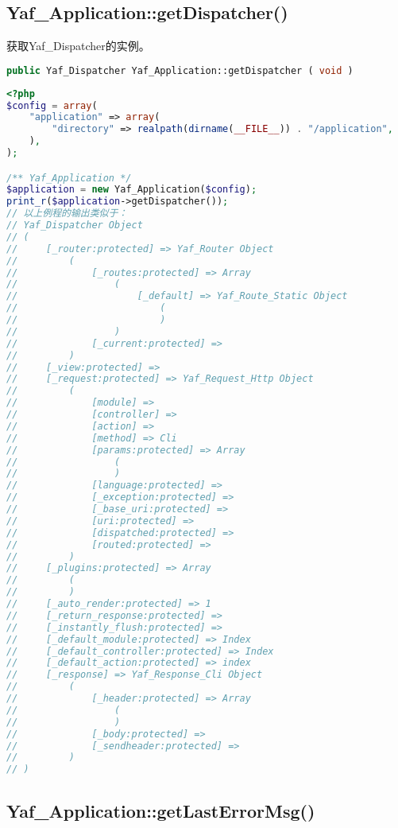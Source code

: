 \subsection{Yaf\_Application::getDispatcher()}

获取Yaf\_Dispatcher的实例。



\begin{lstlisting}[language=PHP]
public Yaf_Dispatcher Yaf_Application::getDispatcher ( void )
\end{lstlisting}


\begin{lstlisting}[language=PHP]
<?php
$config = array(
    "application" => array(
        "directory" => realpath(dirname(__FILE__)) . "/application",
    ),
);

/** Yaf_Application */
$application = new Yaf_Application($config);
print_r($application->getDispatcher());
// 以上例程的输出类似于：
// Yaf_Dispatcher Object
// (
//     [_router:protected] => Yaf_Router Object
//         (
//             [_routes:protected] => Array
//                 (
//                     [_default] => Yaf_Route_Static Object
//                         (
//                         )
//                 )
//             [_current:protected] => 
//         )
//     [_view:protected] => 
//     [_request:protected] => Yaf_Request_Http Object
//         (
//             [module] => 
//             [controller] => 
//             [action] => 
//             [method] => Cli
//             [params:protected] => Array
//                 (
//                 )
//             [language:protected] => 
//             [_exception:protected] => 
//             [_base_uri:protected] => 
//             [uri:protected] => 
//             [dispatched:protected] => 
//             [routed:protected] => 
//         )
//     [_plugins:protected] => Array
//         (
//         )
//     [_auto_render:protected] => 1
//     [_return_response:protected] => 
//     [_instantly_flush:protected] => 
//     [_default_module:protected] => Index
//     [_default_controller:protected] => Index
//     [_default_action:protected] => index
//     [_response] => Yaf_Response_Cli Object
//         (
//             [_header:protected] => Array
//                 (
//                 )
//             [_body:protected] => 
//             [_sendheader:protected] => 
//         )
// )
\end{lstlisting}



\subsection{Yaf\_Application::getLastErrorMsg()}

